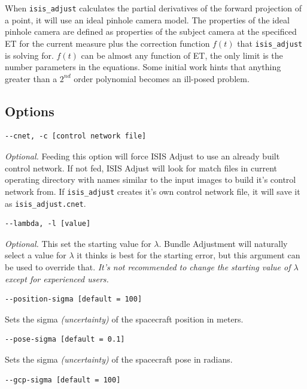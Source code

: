 When \texttt{isis\_adjust} calculates the partial derivatives of the
forward projection of a point, it will use an ideal pinhole camera
model. The properties of the ideal pinhole camera are defined as
properties of the subject camera at the specificed ET for the current
measure plus the correction function $f(t)$ that \texttt{isis\_adjust} is
solving for. $f(t)$ can be almost any function of ET, the only limit is the
number parameters in the equations. Some initial work hints that
anything greater than a $2^{nd}$ order polynomial becomes an ill-posed
problem.

\subsection{Options}

\begin{verbatim}
--cnet, -c [control network file]
\end{verbatim}

\emph{Optional.} Feeding this option will force ISIS Adjust to use an
already built control network. If not fed, ISIS Adjust will look for
match files in current operating directory with names similar to the
input images to build it's control network from. If
\texttt{isis\_adjust} creates it's own control network file, it will
save it as \verb=isis_adjust.cnet=.

\begin{verbatim}
--lambda, -l [value]
\end{verbatim}

\emph{Optional.} This set the starting value for $\lambda$. Bundle
Adjustment will naturally select a value for $\lambda$ it thinks is
best for the starting error, but this argument can be used to override
that. \emph{It's not recommended to change the starting value of
  $\lambda$ except for experienced users.}

\begin{verbatim}
--position-sigma [default = 100]
\end{verbatim}

Sets the sigma \emph{(uncertainty)} of the spacecraft position in
meters.

\begin{verbatim}
--pose-sigma [default = 0.1]
\end{verbatim}

Sets the sigma \emph{(uncertainty)} of the spacecraft pose in radians.

\begin{verbatim}
--gcp-sigma [default = 100]
\end{verbatim}

